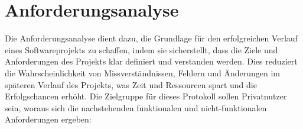 \chapter{Anforderungsanalyse}



Die Anforderungsanalyse dient dazu, die Grundlage für den erfolgreichen Verlauf eines Softwareprojekts 
zu schaffen, indem sie sicherstellt, dass die Ziele und Anforderungen des Projekts klar definiert 
und verstanden werden. Dies reduziert die Wahrscheinlichkeit von Missverständnissen, Fehlern und 
Änderungen im späteren Verlauf des Projekts, was Zeit und Ressourcen spart und die Erfolgschancen erhöht.
Die Zielgruppe für dieses Protokoll sollen Privatnutzer sein, woraus sich die nachstehenden funktionalen 
und nicht-funktionalen Anforderungen ergeben:



